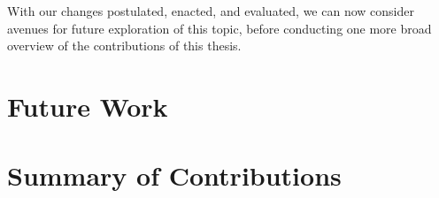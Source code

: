 With our changes postulated, enacted, and evaluated, we can now consider avenues
for future exploration of this topic, before conducting one more broad overview of
the contributions of this thesis.

\section{Future Work}



\section{Summary of Contributions}


